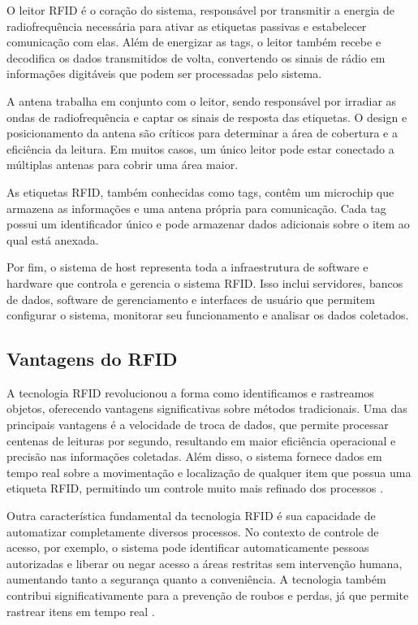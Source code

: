 O leitor RFID é o coração do sistema, responsável por transmitir a energia de radiofrequência necessária para ativar as etiquetas passivas e estabelecer comunicação com elas. Além de energizar as tags, o leitor também recebe e decodifica os dados transmitidos de volta, convertendo os sinais de rádio em informações digitáveis que podem ser processadas pelo sistema.

A antena trabalha em conjunto com o leitor, sendo responsável por irradiar as ondas de radiofrequência e captar os sinais de resposta das etiquetas. O design e posicionamento da antena são críticos para determinar a área de cobertura e a eficiência da leitura. Em muitos casos, um único leitor pode estar conectado a múltiplas antenas para cobrir uma área maior.

As etiquetas RFID, também conhecidas como tags, contêm um microchip que armazena as informações e uma antena própria para comunicação. Cada tag possui um identificador único e pode armazenar dados adicionais sobre o item ao qual está anexada.

Por fim, o sistema de host representa toda a infraestrutura de software e hardware que controla e gerencia o sistema RFID. Isso inclui servidores, bancos de dados, software de gerenciamento e interfaces de usuário que permitem configurar o sistema, monitorar seu funcionamento e analisar os dados coletados.

\subsection{Vantagens do RFID}

A tecnologia RFID revolucionou a forma como identificamos e rastreamos objetos, oferecendo vantagens significativas sobre métodos tradicionais. Uma das principais vantagens é a velocidade de troca de dados, que permite processar centenas de leituras por segundo, resultando em maior eficiência operacional e precisão nas informações coletadas. Além disso, o sistema fornece dados em tempo real sobre a movimentação e localização de qualquer item que possua uma etiqueta RFID, permitindo um controle muito mais refinado dos processos \cite{avery-dennison-rfid}.

Outra característica fundamental da tecnologia RFID é sua capacidade de automatizar completamente diversos processos. No contexto de controle de acesso, por exemplo, o sistema pode identificar automaticamente pessoas autorizadas e liberar ou negar acesso a áreas restritas sem intervenção humana, aumentando tanto a segurança quanto a conveniência. A tecnologia também contribui significativamente para a prevenção de roubos e perdas, já que permite rastrear itens em tempo real \cite{vieira-rfid-2007}.

